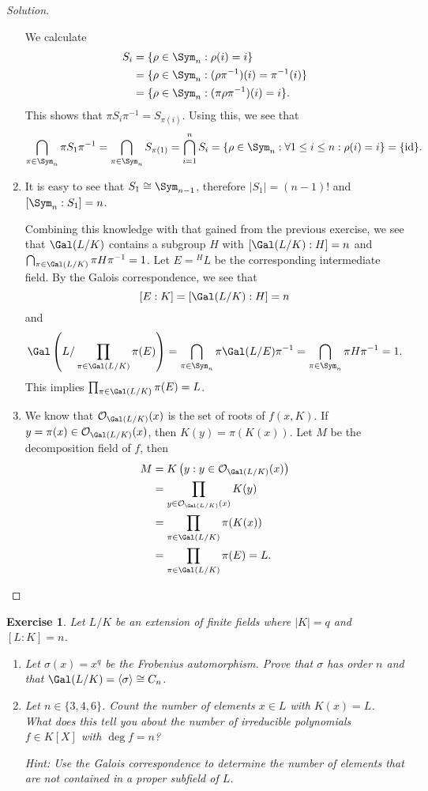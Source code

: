 \documentclass[a4paper,10pt,reqno]{amsart}
\newtheorem{ex}{Exercise}[section]
\newenvironment{sol}
  {\renewcommand\qedsymbol{$\blacksquare$}\begin{proof}[Solution]}
  {\end{proof}}
\begin{document}
\begin{sol}
\begin{enumerate}[label=(\roman*)]
We calculate
\begin{align*}
    S_i & = \{ \rho \in \Sym_n : \rho(i) = i \} \\
    & = \{ \rho \in \Sym_n : (\rho\pi^{-1})(i) = \pi^{-1}(i) \} \\
    & = \{ \rho \in \Sym_n : (\pi\rho \pi^{-1})(i) = i \}.
\end{align*}
This shows that $\pi S_i \pi^{-1} = S_{\pi(i)}$. Using this, we see that
\[
\bigcap_{\pi \in \Sym_n} \pi S_1 \pi^{-1}  = \bigcap_{\pi \in \Sym_n} S_{\pi(1)} = \bigcap_{i=1}^n S_i
= \{ \rho \in \Sym_n: \forall 1 \leq i \leq n : \rho(i) = i \} = \{ \mathrm{id} \}.
\]
\item It is easy to see that $S_1 \cong \Sym_{n-1}$, therefore $|S_1| = (n-1)!$ and $[\Sym_n:S_1] = n$.

Combining this knowledge with that gained from the previous exercise, we see that $\Gal(L/K)$ contains a subgroup $H$ with $[\Gal(L/K):H] = n$ and $\bigcap_{\pi \in \Gal(L/K)} \pi H \pi^{-1} = 1$. Let $E = {}^HL$ be the corresponding intermediate field. By the Galois correspondence, we see that
\[
[E:K] = [\Gal(L/K):H] = n
\]
and
\[
    \Gal \left( L/ \prod_{\pi \in \Gal(L/K)} \pi(E) \right) = \bigcap_{\pi \in \Sym_n} \pi \Gal(L/E) \pi^{-1}
    = \bigcap_{\pi \in \Sym_n} \pi H \pi^{-1} = 1.
\]
This implies $\prod_{\pi \in \Gal(L/K)} \pi(E) = L$.

\item We know that $\mathcal{O}_{\Gal(L/K)}(x)$ is the set of roots of $f(x,K)$. If $y = \pi(x) \in \mathcal{O}_{\Gal(L/K)}(x)$, then $K(y) = \pi(K(x))$. Let $M$ be the decomposition field of $f$, then
\begin{align*}
    M & = K\left( y : y \in \mathcal{O}_{\Gal(L/K)}(x) \right) \\
    & = \prod_{y \in \mathcal{O}_{\Gal(L/K)}(x)}K(y) \\
    & = \prod_{\pi \in \Gal(L/K)} \pi(K(x)) \\
    & = \prod_{\pi \in \Gal(L/K)} \pi(E) = L.
\end{align*}
\end{enumerate}
\end{sol}

\begin{ex}
\label{9.2}
    Let $L/K$ be an extension of finite fields where $|K| = q$ and $[L:K] = n$.
\begin{enumerate}[label=(\roman*)]
\item Let $\sigma(x) = x^q$ be the Frobenius automorphism. Prove that $\sigma$ has order $n$ and that $\Gal(L/K) = \left\langle \sigma \right\rangle \cong C_n$.
\item Let $n \in \{3,4,6\}$. Count the number of elements $x \in L$ with $K(x) = L$. What does this tell you about the number of irreducible polynomials $f \in K[X]$ with $\deg f = n$?

\noindent \textit{Hint:} Use the Galois correspondence to determine the number of elements that are not contained in a proper subfield of $L$.
\end{enumerate} 
\end{ex}
\end{document}
